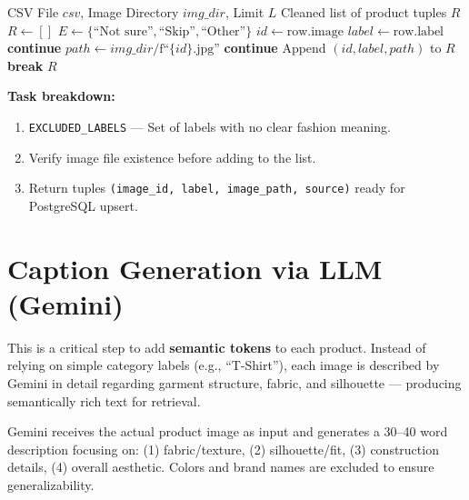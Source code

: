 \begin{algorithm}[H]
\caption{Data Ingestion and Noise Filtering}\label{alg:data_filtering}
\begin{algorithmic}[1]
\Require CSV File $csv$, Image Directory $img\_dir$, Limit $L$
\Ensure Cleaned list of product tuples $R$
    \State $R \gets []$
    \State $E \gets \{\text{``Not sure''}, \text{``Skip''}, \text{``Other''}\}$
        \State $id \gets \text{row.image}$
        \State $label \gets \text{row.label}$
            \State \textbf{continue}
        \EndIf
        \State $path \gets img\_dir / \text{f``}\{id\}\text{.jpg''}$
            \State \textbf{continue}
        \EndIf
        \State Append $(id, label, path)$ to $R$
            \State \textbf{break}
        \EndIf
    \EndFor
    \State \Return $R$
\EndFunction
\end{algorithmic}
\end{algorithm}

\textbf{Task breakdown:}
\begin{enumerate}
    \item \texttt{EXCLUDED\_LABELS} --- Set of labels with no clear fashion meaning.
    \item Verify image file existence before adding to the list.
    \item Return tuples \texttt{(image\_id, label, image\_path, source)} ready for PostgreSQL upsert.
\end{enumerate}

\section{Caption Generation via LLM (Gemini)}

This is a critical step to add \textbf{semantic tokens} to each product. Instead of relying on simple category labels (e.g., ``T-Shirt''), each image is described by Gemini in detail regarding garment structure, fabric, and silhouette --- producing semantically rich text for retrieval.

\begin{tcolorbox}[title=Method: Multimodal Caption Generation]
Gemini receives the actual product image as input and generates a 30--40 word description focusing on: (1) fabric/texture, (2) silhouette/fit, (3) construction details, (4) overall aesthetic. Colors and brand names are excluded to ensure generalizability.
\end{tcolorbox}

